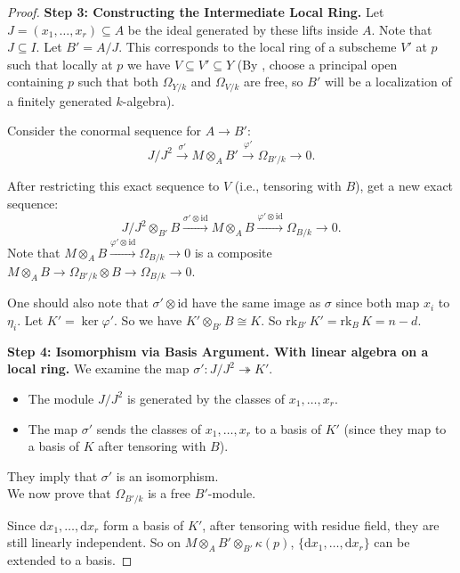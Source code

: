 \begin{proof}
    \textbf{Step 3: Constructing the Intermediate Local Ring.}
    Let $J = (x_1, \dots, x_r) \subseteq A$ be the ideal generated by these lifts inside $A$. Note that $J \subseteq I$.
    Let $B' = A/J$. This corresponds to the local ring of a subscheme $V'$ at $p$ such that locally at $p$ we have $V \subseteq V' \subseteq Y$ (By \cite[\href{https://stacks.math.columbia.edu/tag/05LI}{Tag 05LI (4)}]{stacks-project}, choose a principal open containing $p$ such that both $\Omega_{Y/k}$ and $\Omega_{V/k}$ are free, so $B'$ will be a localization of a finitely generated $k$-algebra).

    Consider the conormal sequence for $A \to B'$:
    \[
        J/J^2 \xrightarrow{\sigma'} M \otimes_A B' \xrightarrow{\varphi'} \Omega_{B'/k} \longrightarrow 0.
    \]

    After restricting this exact sequence to $V$ (i.e., tensoring with $B$), get a new exact sequence:
    \[
        J/J^2 \otimes_{B'} B \xrightarrow{\sigma' \otimes \text{id}} M \otimes_A B \xrightarrow{\varphi' \otimes \text{id}} \Omega_{B/k} \longrightarrow 0.
    \]
    Note that $M \otimes_A B \xrightarrow{\varphi' \otimes \text{id}} \Omega_{B/k} \longrightarrow 0$ is a composite $M \otimes_A B \longrightarrow \Omega_{B'/k} \otimes B \longrightarrow \Omega_{B/k}\longrightarrow 0$.

    One should also note that $\sigma' \otimes \text{id}$ have the same image as $\sigma$ since both map $x_i$ to $\eta_i$. Let $K' = \ker \varphi'$. So we have $K' \otimes_{B'} B \cong K$. So $\text{rk}_{B'}\, K' = \text{rk}_{B}\, K = n-d$.

    \textbf{Step 4: Isomorphism via Basis Argument. With linear algebra on a local ring.}
    We examine the map $\sigma': J/J^2 \twoheadrightarrow K'$.
    \begin{itemize}
        \item The module $J/J^2$ is generated by the classes of $x_1, \dots, x_r$.
        \item The map $\sigma'$ sends the classes of $x_1, \dots, x_r$ to a basis of $K'$ (since they map to a basis of $K$ after tensoring with $B$).
    \end{itemize}
    They imply that $\sigma'$ is an isomorphism.\\

    We now prove that $\Omega_{B'/k}$ is a free $B'$-module.

    Since $\text{d}x_1, \dots, \text{d}x_r$ form a basis of $K'$, after tensoring with residue field, they are still linearly independent.
    So on $M \otimes_A B' \otimes_{B'} \kappa(p)$, $\{\text{d}x_1, \dots, \text{d}x_r\}$ can be extended to a basis.


\end{proof}
